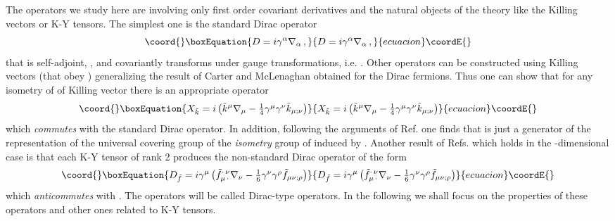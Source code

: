 \documentclass[a4paper,12pt]{article}
\begin{document}
The operators we study here are involving only first order covariant 
derivatives and the natural objects of the theory like the Killing vectors or 
K-Y tensors. The simplest one is the  standard Dirac operator   
\begin{equation}\coord{}\boxEquation{\label{Dirac}
D=i\gamma^{\alpha}\nabla_{\alpha}\,,   
}{D=i\gamma^{\alpha}\nabla_{\alpha}\,,   
}{ecuacion}\coordE{}\end{equation}
that is self-adjoint, \coordHE{}, and covariantly transforms 
under gauge transformations, i.e. \coordHE{}. Other operators 
can be constructed using  Killing vectors \coordHE{} (that obey 
\coordHE{}) generalizing the result of Carter 
and McLenaghan \cite{CML} obtained for the Dirac fermions. Thus one can show 
that for any 
isometry of \coordHE{} of Killing vector \coordHE{} there is an appropriate 
operator 
\begin{equation}\coord{}\boxEquation{\label{kil}
X_{\tilde k} = i \left(\tilde k^\mu \nabla_\mu - \textstyle{1\over 4} 
\gamma^\mu \gamma^\nu 
\tilde k_{\mu;\nu}\right)
}{X_{\tilde k} = i \left(\tilde k^\mu \nabla_\mu - \textstyle{1\over 4} 
\gamma^\mu \gamma^\nu 
\tilde k_{\mu;\nu}\right)
}{ecuacion}\coordE{}\end{equation}
which {\em commutes} with the standard Dirac operator. In addition, following 
the arguments of Ref. \cite{ES} one finds that \coordHE{} is just a generator of 
the representation of the universal covering group of the {\em isometry} 
group of \coordHE{} induced by \coordHE{}. Another result of 
Refs. \cite{CML, MLS, KML} which holds in the \coordHE{}-dimensional case is that
each K-Y tensor \coordHE{} of rank 2 produces the non-standard Dirac operator 
of the form 
\begin{equation}\coord{}\boxEquation{\label{df}
D_{\tilde f} = i\gamma^\mu \left(\tilde f_{\mu\,\cdot}^{\cdot\,\nu}\nabla_\nu  
- \textstyle{1\over 6}\gamma^\nu 
\gamma^\rho \tilde f_{\mu\nu;\rho}\right)
}{D_{\tilde f} = i\gamma^\mu \left(\tilde f_{\mu\,\cdot}^{\cdot\,\nu}\nabla_\nu  
- \textstyle{1\over 6}\gamma^\nu 
\gamma^\rho \tilde f_{\mu\nu;\rho}\right)
}{ecuacion}\coordE{}\end{equation}
which {\em anticommutes} with  \coordHE{}. The operators \coordHE{} 
will be called Dirac-type operators. 
In the following we shall focus on the properties of these  operators 
and other ones related to  K-Y tensors. 
\end{document}
